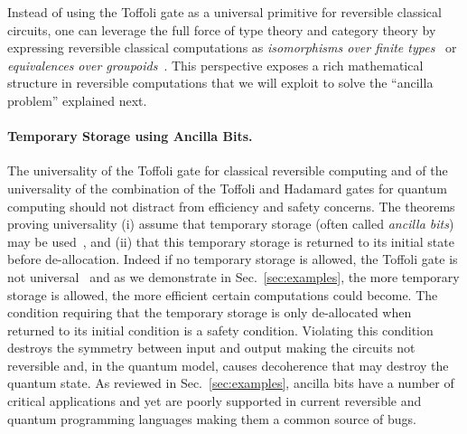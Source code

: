\documentclass[sigplan,10pt,review,anonymous]{acmart}
\begin{document}
Instead of using the Toffoli gate as a universal primitive for
reversible classical circuits, one can leverage the full force of type
theory and category theory by expressing reversible classical
computations as \emph{isomorphisms over finite
  types}~\cite{Fiore:2004,James:2012:IE:2103656.2103667} or
\emph{equivalences over
  groupoids}~\cite{DBLP:conf/esop/CaretteS16}. This perspective
exposes a rich mathematical structure in reversible computations
that we will exploit to solve the ``ancilla problem'' explained next. 

\paragraph*{Temporary Storage using Ancilla Bits.} The universality of
the Toffoli gate for classical reversible computing and of the
universality of the combination of the Toffoli and Hadamard gates for
quantum computing should not distract from efficiency and safety
concerns. The theorems proving universality (i) assume that temporary
storage (often called \emph{ancilla bits}) may be
used~\cite{Toffoli:1980}, and (ii) that this temporary storage is
returned to its initial state before de-allocation. Indeed if no
temporary storage is allowed, the Toffoli gate is not
universal~\cite{DBLP:conf/innovations/AaronsonGS17} and as we
demonstrate in Sec.~\ref{sec:examples}, the more temporary storage is
allowed, the more efficient certain computations could become. The
condition requiring that the temporary storage is only de-allocated
when returned to its initial condition is a safety
condition. Violating this condition destroys the symmetry between
input and output making the circuits not reversible and, in the
quantum model, causes decoherence that may destroy the quantum
state. As reviewed in Sec.~\ref{sec:examples}, ancilla bits have a
number of critical applications and yet are poorly supported in
current reversible and quantum programming languages making them a
common source of bugs.
\end{document}

